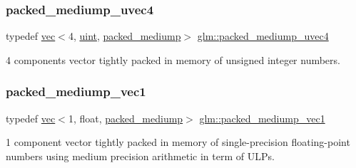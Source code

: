 \mbox{\label{group__gtc__type__aligned_ga228b9899ea277eb8655d01c754e1ee64}} 
\subsubsection{\texorpdfstring{packed\+\_\+mediump\+\_\+uvec4}{packed\_mediump\_uvec4}}
{\footnotesize\ttfamily typedef \hyperlink{structglm_1_1vec}{vec}$<$4, \hyperlink{group__core__precision_ga4fd29415871152bfb5abd588334147c8}{uint}, \hyperlink{namespaceglm_a36ed105b07c7746804d7fdc7cc90ff25a9604654c3b137cd7898689fd34b25bc0}{packed\+\_\+mediump}$>$ \hyperlink{group__gtc__type__aligned_ga228b9899ea277eb8655d01c754e1ee64}{glm\+::packed\+\_\+mediump\+\_\+uvec4}}



4 components vector tightly packed in memory of unsigned integer numbers. 

\mbox{\label{group__gtc__type__aligned_gadf62fccc1514b0dca7ab1067263fca4c}} 
\subsubsection{\texorpdfstring{packed\+\_\+mediump\+\_\+vec1}{packed\_mediump\_vec1}}
{\footnotesize\ttfamily typedef \hyperlink{structglm_1_1vec}{vec}$<$1, float, \hyperlink{namespaceglm_a36ed105b07c7746804d7fdc7cc90ff25a9604654c3b137cd7898689fd34b25bc0}{packed\+\_\+mediump}$>$ \hyperlink{group__gtc__type__aligned_gadf62fccc1514b0dca7ab1067263fca4c}{glm\+::packed\+\_\+mediump\+\_\+vec1}}



1 component vector tightly packed in memory of single-\/precision floating-\/point numbers using medium precision arithmetic in term of U\+L\+Ps. 

